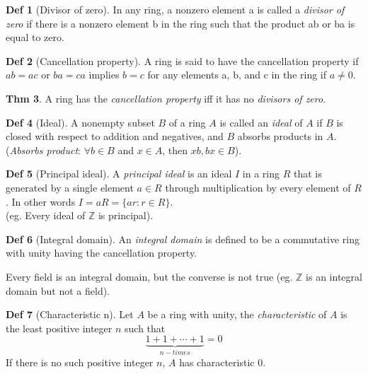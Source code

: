 \documentclass{article}
\theoremstyle{definition}
\newtheorem{definition}{Def}[section]
\newtheorem{theorem}[definition]{Thm}
\begin{document}
\begin{definition}[Divisor of zero]
    In any ring, a nonzero element a is called a \emph{divisor of zero} if there is a
    nonzero element b in the ring such that the product ab or ba is equal to
    zero.
\end{definition}

\begin{definition}[Cancellation property]
A ring is said to have the cancellation property if $ab = ac$ or $ba = ca$ implies $b = c$
for any elements a, b, and c in the ring if $a \neq 0$.
\end{definition}

\begin{theorem}
    A ring has the \emph{cancellation property} iff it has no \emph{divisors of zero}.
\end{theorem}

\begin{definition}[Ideal]
    A nonempty subset $B$ of a ring $A$ is called an \emph{ideal} of $A$ if $B$ is closed with respect to addition and negatives, and $B$ absorbs products in $A$.
    \\
    (\emph{Absorbs product}: $\forall b \in B$ and $x \in A$, then $xb, bx \in B$).
\end{definition}

\begin{definition}[Principal ideal]
    A \emph{principal ideal} is an ideal $I$ in a ring $R$ that is generated by a single element $a \in R$ through multiplication by every element of $R$. In other words $I = aR = \{a r : r \in R \}$.
    \\
    (eg. Every ideal of $\mathbb{Z}$ is principal).
\end{definition}

\begin{definition}[Integral domain]
    An \emph{integral domain} is defined to be a commutative ring with unity having the cancellation property.
\end{definition}

Every field is an integral domain, but the converse is not true (eg. $\mathbb{Z}$ is an integral domain but not a field).

\begin{definition}[Characteristic n]
    Let $A$ be a ring with unity, the \emph{characteristic} of $A$ is the least positive integer $n$ such that
    $$\underbrace{1 + 1 + \cdots + 1}_{n-times} = 0$$
    If there is no such positive integer $n$, $A$ has characteristic $0$.
\end{definition}
\end{document}
